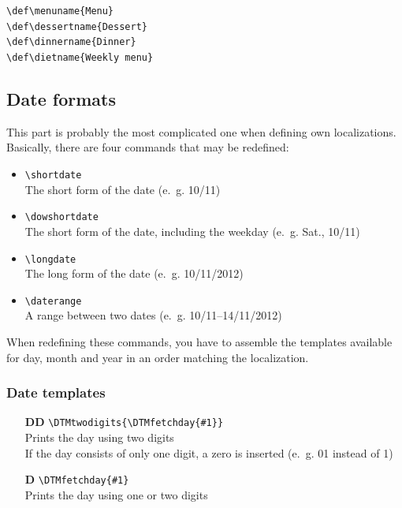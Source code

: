 \documentclass[11pt]{ltxdoc}
\begin{document}
	\medskip
	\verb|\def\menuname{Menu}| \\
	\verb|\def\dessertname{Dessert}| \\
	\verb|\def\dinnername{Dinner}| \\
	\verb|\def\dietname{Weekly menu}|
	
	
	\subsection{Date formats}
	This part is probably the most complicated one when defining own localizations. \\
	Basically, there are four commands that may be redefined:
	\begin{itemize}
		\item \verb|\shortdate| \\
		The short form of the date (e.~g. 10/11)
		
		\item \verb|\dowshortdate| \\
		The short form of the date, including the weekday (e.~g. Sat., 10/11)
		
		\item \verb|\longdate| \\
		The long form of the date (e.~g. 10/11/2012)
		
		\item \verb|\daterange| \\
		A range between two dates (e.~g. 10/11--14/11/2012)
	\end{itemize}
	
	\medskip
	When redefining these commands, you have to assemble the templates available for day, month and year in an order matching the localization.
	
	\subsubsection*{Date templates}
	\begin{itemize}
		\item[\sffamily\bfseries DD]
		\verb|\DTMtwodigits{\DTMfetchday{#1}}| \\
		Prints the day using two digits \\
		If the day consists of only one digit, a zero is inserted  (e.~g. 01 instead of 1)
		
		\item[\sffamily\bfseries D]
		\verb|\DTMfetchday{#1}| \\
		Prints the day using one or two digits
	\end{itemize}
	
\end{document}
